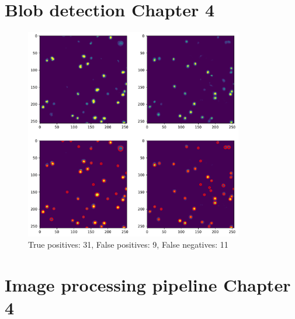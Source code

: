 \section{Blob detection Chapter 4}

\begin{figure}[h!]
\centering
\includegraphics[width=0.85\textwidth]{img/blob_detection.pdf}
\caption{True positives: 31, False positives: 9, False negatives: 11}
\label{fig:blob_detection}
\end{figure}

\section{Image processing pipeline Chapter 4}

